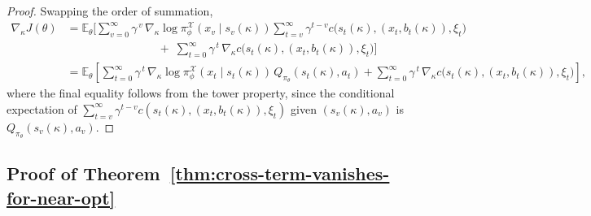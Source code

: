 \documentclass{article}
\theoremstyle{definition}
\theoremstyle{remark}
\begin{document}
\begin{proof}
Swapping the order of summation,
\begin{align*}
\nabla_\kappa J(\theta)
&=
\mathbb{E}_{\theta}\!\Bigg[
\sum_{v=0}^{\infty}
\gamma^{\,v}\,
\nabla_{\kappa}\log \pi^{\mathcal{X}}_{\phi}\!\left(x_v \mid s_v(\kappa)\right)
\sum_{t=v}^{\infty} \gamma^{t-v}
c\big(s_t(\kappa), (x_t, b_t(\kappa)), \xi_t\big)
\\
&\qquad\qquad\qquad\qquad
+\;
\sum_{t=0}^{\infty}\gamma^{\,t}\,
\nabla_{\kappa} c\big(s_t(\kappa), (x_t, b_t(\kappa)), \xi_t\big)
\Bigg]
\\[6pt]
&=
\mathbb{E}_{\theta}\!\left[
\sum_{t=0}^{\infty}
\gamma^{\,t}\,
\nabla_{\kappa}\log \pi^{\mathcal{X}}_{\phi}\!\left(x_t \mid s_t(\kappa)\right)\,
Q_{\pi_{\theta}}(s_t(\kappa),a_t)
+
\sum_{t=0}^{\infty}\gamma^{\,t}\,
\nabla_{\kappa} c\big(s_t(\kappa), (x_t, b_t(\kappa)), \xi_t\big)
\right],
\end{align*}
where the final equality follows from the tower property, since the conditional expectation of
$\sum_{t=v}^{\infty}\gamma^{t-v}c(s_t(\kappa),(x_t,b_t(\kappa)),\xi_t)$
given $(s_v(\kappa),a_v)$ is $Q_{\pi_\theta}(s_v(\kappa),a_v)$.

\end{proof}


\subsection{Proof of Theorem~\ref{thm:cross-term-vanishes-for-near-opt}}
\label{sec:proof-of-vanishing-cross-term}
\end{document}
